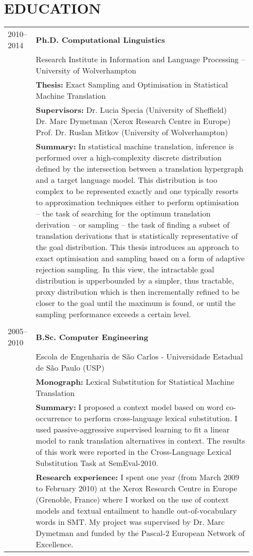 \section*{EDUCATION}

\begin{tabular}{p{2cm}  p{13.92cm}}
2010--2014 & \bf Ph.D. Computational Linguistics  \\
 & Research Institute in Information and Language Processing – University of Wolverhampton \\
 & {\bf Thesis:} Exact Sampling and Optimisation in Statistical Machine Translation \\
 & {\bf Supervisors:} \pbox[t]{13.92cm}{Dr. Lucia Specia (University of Sheffield) \\ Dr. Marc Dymetman (Xerox Research Centre in Europe) \\ Prof. Dr. Ruslan Mitkov (University of Wolverhampton)} \\
 & {\bf Summary:} In statistical machine translation, inference is performed over a high-complexity discrete distribution defined by the intersection between a translation hypergraph and a target language model. This distribution is too complex to be represented exactly and one typically resorts to approximation techniques either to perform optimisation -- the task of searching for the optimum translation derivation -- or sampling -- the task of finding a subset of translation derivations that is statistically representative of the goal distribution.  This thesis introduces an approach to exact optimisation and sampling based on a form of adaptive rejection sampling. In this view, the intractable goal distribution is upperbounded by a simpler, thus tractable, proxy distribution which is then incrementally refined to be closer to the goal until the maximum is found, or until the sampling performance exceeds a certain level.\\
 & \\
2005--2010 	& \bf B.Sc. Computer Engineering  \\ %
 & Escola de Engenharia de S\~ao Carlos - Universidade Estadual de S\~ao Paulo (USP) \\
 & {\bf Monograph:} Lexical Substitution for Statistical Machine Translation \\
 & {\bf Summary:} I proposed a context model based on word co-occurrence to perform cross-language lexical substitution. I used passive-aggressive supervised learning to fit a linear model to rank translation alternatives in context. The results of this work were reported in the Cross-Language Lexical Substitution Task at SemEval-2010. \\
 & {\bf Research experience:} I spent one year (from March 2009 to February 2010) at the Xerox Research Centre in Europe (Grenoble, France) where I worked on the use of context models and textual entailment to handle out-of-vocabulary words in SMT. My project was supervised by Dr. Marc Dymetman and funded by the Pascal-2 European Network of Excellence.\\
\end{tabular}

